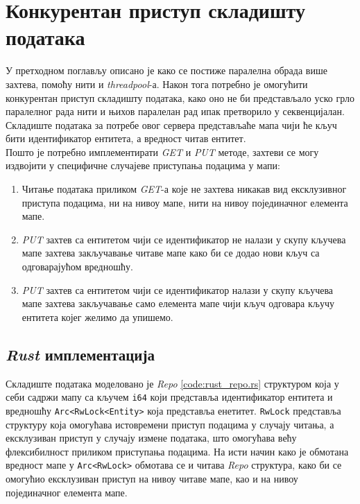 \section{Конкурентан приступ складишту података}

У претходном поглављу описано је како се постиже паралелна обрада више захтева, помоћу нити и \textit{threadpool}-а. Након тога потребно је омогућити конкурентан приступ складишту података, како оно не би представљало уско грло паралелног рада нити и њихов паралелан рад ипак претворило у секвенцијалан. Складиште података за потребе овог сервера представљаће мапа чији ће кључ бити идентификатор ентитета, а вредност читав ентитет.\\

Пошто је потребно имплементирати \textit{GET} и \textit{PUT} методе, захтеви се могу издвојити у  специфичне случајеве приступања подацима у мапи:

\begin{enumerate}\label{list:concurrent_cases}
    \item Читање података приликом \textit{GET}-а које не захтева никакав вид ексклузивног приступа подацима, ни на нивоу мапе, нити на нивоу појединачног елемента мапе.
    \item \textit{PUT} захтев са ентитетом чији се идентификатор не налази у скупу кључева мапе захтева закључавање читаве мапе како би се додао нови кључ са одговарајућом вредношћу.
    \item \textit{PUT} захтев са ентитетом чији се идентификатор  налази у скупу кључева мапе захтева закључавање само елемента мапе чији кључ одговара кључу ентитета којег желимо да упишемо.
\end{enumerate}

\subsection{\textit{Rust} имплементација}

Складиште података моделовано је \textit{Repo} \ref{code:rust_repo.rs} структуром која у себи садржи мапу са кључем \texttt{i64} који представља идентификатор ентитета и вредношћу \texttt{Arc<RwLock<Entity>} која представља енетитет. \texttt{RwLock} представља структуру која омогућава истовремени приступ подацима у случају читања, а ексклузиван приступ у случају измене података, што омогућава већу флексибилност приликом приступања подацима. На исти начин како је обмотана вредност мапе у  \texttt{Arc<RwLock>} обмотава се и читава \textit{Repo} структура, како би се омогућио ексклузиван приступ на нивоу читаве мапе, као и на нивоу појединачног елемента мапе.\\

